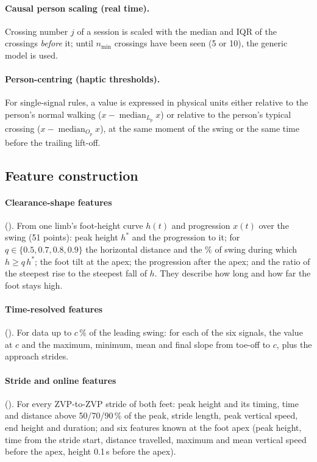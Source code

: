 \paragraph{Causal person scaling (real time).} Crossing number $j$ of a session is scaled with the median and IQR of the
crossings \emph{before} it; until $n_{\min}$ crossings have been seen (5 or 10), the generic model is used.

\paragraph{Person-centring (haptic thresholds).} For single-signal rules, a value is expressed in physical units either
relative to the person's normal walking ($x - \operatorname{median}_{L_p} x$) or relative to the person's typical crossing
($x - \operatorname{median}_{O_p} x$), at the same moment of the swing or the same time before the trailing lift-off.

\subsection{Feature construction}
\label{sec:features}

\paragraph{Clearance-shape features} (). From one limb's foot-height curve $h(t)$ and progression
$x(t)$ over the swing (51 points): peak height $h^*$ and the progression to it; for $q \in \{0.5,0.7,0.8,0.9\}$ the horizontal
distance and the \% of swing during which $h \geq q\,h^*$; the foot tilt at the apex; the progression after the apex; and the
ratio of the steepest rise to the steepest fall of $h$. They describe how long and how far the foot stays high.

\paragraph{Time-resolved features} (). For data up to $c\,\%$ of the leading swing: for each of the six
signals, the value at $c$ and the maximum, minimum, mean and final slope from toe-off to $c$, plus the approach strides.

\paragraph{Stride and online features} (). For every ZVP-to-ZVP stride of both feet: peak height and
its timing, time and distance above 50/70/90\,\% of the peak, stride length, peak vertical speed, end height and duration;
and six features known at the foot apex (peak height, time from the stride start, distance travelled, maximum and mean
vertical speed before the apex, height 0.1\,s before the apex).

